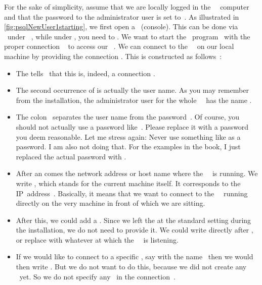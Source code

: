 %
%
%

For the sake of simplicity, assume that we are locally logged in the \db~\server\ computer and that the password to the administrator user  is set to~.
As illustrated in \cref{fig:psqlNewUser1starting}, we first open a ~(console).
This can be done via \ubuntuTerminal\ under \ubuntu\ \linux, while under \microsoftWindows, you need to \windowsTerminal.
We want to start the \client\ program \psql\ with the proper connection ~\cite{PGDG:PD:CU} to access our \postgresql\ \server.%
%
%
%
We can connect to the \postgresql\ \server\ on our local machine by providing the connection  .
This  is constructed as follows~\cite{PGDG:PD:CU}:%
%
\begin{itemize}%
%
\item The  tells \psql\ that this is, indeed, a connection .
%
\item The second occurrence of  is actually the user name.
As you may remember from the installation, the administrator user for the whole \postgresql\ \server\ has the name .%
%
\item The colon~\inQuotes{\textil{:}} separates the user name from the password~.
Of course, you should not actually use a password like~.
Please replace it with a password you deem reasonable.
Let me stress again:
Never use something like  as a password.
I am also not doing that.
For the examples in the book, I just replaced the actual password with .
%
\item After an  comes the network address or host name where the \postgresql\ \server\ is running.
We write \localhost, which stands for the current machine itself.
It corresponds to the IP~address~.
Basically, it means that we want to connect to the \postgresql\ \server\ running directly on the very machine in front of which we are sitting.%
%
\item After this, we could add a .
Since we left the   at the standard setting during the installation, we do not need to provide it.
We could write  directly after \localhost, or replace  with whatever  at which the \postgresql\ \server\ is listening.%
%
\item If we would like to connect to a specific \db, say with the name~ then we would then write .
But we do not want to do this, because we did not create any \db\ yet.
So we do not specify any \db\ in the connection~.%
\end{itemize}%
